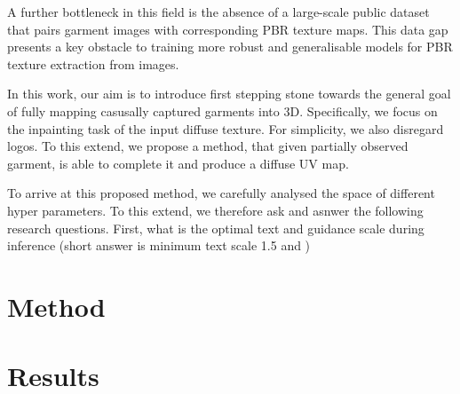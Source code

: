 \documentclass[11pt,twocolumn]{article}
\begin{document}
A further bottleneck in this field is the absence of a large-scale public dataset that pairs garment images with corresponding PBR texture maps. This data gap presents a key obstacle to training more robust and generalisable models for PBR texture extraction from images.

In this work, our aim is to introduce first stepping stone towards the general goal of fully mapping casusally captured
garments into 3D. Specifically, we focus on the inpainting task of the input diffuse texture. For simplicity, we also disregard logos.
To this extend, we propose a method, that given partially observed garment, is able to complete it and produce a diffuse UV map.


To arrive at this proposed method, we carefully analysed the space of different hyper parameters. To this extend,
we therefore ask and asnwer the following research questions. First, what is the optimal text and guidance scale
during inference (short answer is minimum text scale 1.5 and )

\section{Method}

\section{Results}
\end{document}
